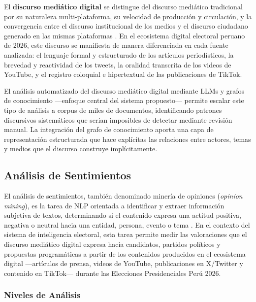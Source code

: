 El \textbf{discurso mediático digital} se distingue del discurso mediático tradicional por su naturaleza multi-plataforma, su velocidad de producción y circulación, y la convergencia entre el discurso institucional de los medios y el discurso ciudadano generado en las mismas plataformas \parencite{mc_chadwick2013hybrid}. En el ecosistema digital electoral peruano de 2026, este discurso se manifiesta de manera diferenciada en cada fuente analizada: el lenguaje formal y estructurado de los artículos periodísticos, la brevedad y reactividad de los tweets, la oralidad transcrita de los videos de YouTube, y el registro coloquial e hipertextual de las publicaciones de TikTok.

El análisis automatizado del discurso mediático digital mediante LLMs y grafos de conocimiento —enfoque central del sistema propuesto— permite escalar este tipo de análisis a corpus de miles de documentos, identificando patrones discursivos sistemáticos que serían imposibles de detectar mediante revisión manual. La integración del grafo de conocimiento aporta una capa de representación estructurada que hace explícitas las relaciones entre actores, temas y medios que el discurso construye implícitamente.

\subsection{Análisis de Sentimientos}

El análisis de sentimientos, también denominado minería de opiniones (\textit{opinion mining}), es la tarea de NLP orientada a identificar y extraer información subjetiva de textos, determinando si el contenido expresa una actitud positiva, negativa o neutral hacia una entidad, persona, evento o tema \parencite{tec_liu2012sentiment}. En el contexto del sistema de inteligencia electoral, esta tarea permite medir las valoraciones que el discurso mediático digital expresa hacia candidatos, partidos políticos y propuestas programáticas a partir de los contenidos producidos en el ecosistema digital —artículos de prensa, videos de YouTube, publicaciones en X/Twitter y contenido en TikTok— durante las Elecciones Presidenciales Perú 2026.

\subsubsection{Niveles de Análisis}

